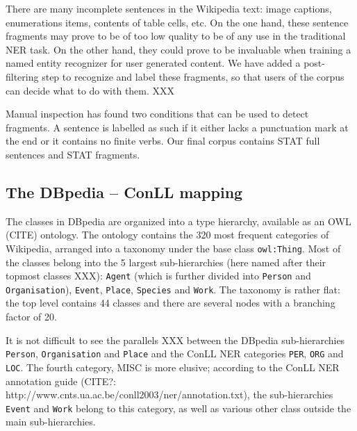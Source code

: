 \documentclass[11pt]{article}
\begin{document}
There are many incomplete sentences in the Wikipedia text: image captions, enumerations items, contents of table cells, etc. On the one hand, these sentence fragments may prove to be of too low quality to be of any use in the traditional NER task. On the other hand, they could prove to be invaluable when training a named entity recognizer for user generated content. We have added a post-filtering step to recognize and label these fragments, so that users of the corpus can decide what to do with them. XXX

Manual inspection has found two conditions that can be used to detect fragments. A sentence is labelled as such if it either lacks a punctuation mark at the end or it contains no finite verbs. Our final corpus contains STAT full sentences and STAT fragments.


\subsection{The DBpedia -- ConLL mapping}


The classes in DBpedia are organized into a type hierarchy, available as an OWL (CITE) ontology. The ontology contains the 320 most frequent categories of Wikipedia, arranged into a taxonomy under the base class \texttt{owl:Thing}. Most of the classes belong into the 5 largest sub-hierarchies (here named after their topmost classes XXX): \texttt{Agent} (which is further divided into \texttt{Person} and \texttt{Organisation}), \texttt{Event}, \texttt{Place}, \texttt{Species} and \texttt{Work}. The taxonomy is rather flat: the top level contains 44 classes and there are several nodes with a branching factor of 20.

It is not difficult to see the parallels XXX between the DBpedia sub-hierarchies \texttt{Person}, \texttt{Organisation} and \texttt{Place} and the ConLL NER categories \texttt{PER}, \texttt{ORG} and \texttt{LOC}. The fourth category, MISC is more elusive; according to the ConLL NER annotation guide (CITE?: http://www.cnts.ua.ac.be/conll2003/ner/annotation.txt), the sub-hierarchies \texttt{Event} and \texttt{Work} belong to this category, as well as various other class outside the main sub-hierarchies. 
\end{document}
